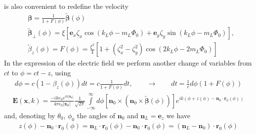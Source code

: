 is also convenient to redefine the velocity
\begin{align}
     & {\boldsymbol{\beta}} = \frac1{1+F(\phi)}\tilde{\boldsymbol{\beta}}(\phi)                                                                       \\
     & \tilde{\boldsymbol{\beta}}_\perp(\phi) =\xi\left[{\bm e}_x\zeta_x\cos(k_L\phi-m_L\varPhi_0)+{\bm e}_y\zeta_y\sin(k_L\phi-m_L\varPhi_0)\right], \\
     & \tilde\beta_z(\phi) =F(\phi)=\frac{\xi^2}4\left[1+(\zeta_x^2-\zeta_y^2)\cos(2k_L\phi-2m_L\varPhi_0)\right]
\end{align}
In the expression of the electric field we perform another change of variables from $ct$ to $\phi=ct-z$, using
\begin{align}
    d\phi = c (1-\beta_z(\phi)) dt = c\frac1{1+F(\phi)} dt,\qquad \rightarrow \qquad dt=\frac1c d\phi(1+F(\phi))
\end{align}
\begin{align}
    {\bm E}({\bm x},k) =\frac{-i k e_0 e^{ik |{\bm x}_0|}}{4\pi\epsilon_0|{\bm x}_0|}\frac1{\sqrt{2\pi}}\int\limits_{-\infty}^{\infty}d\phi\left[{{\bm n}_0\times({\bm n}_0\times\tilde{\boldsymbol\beta}(\phi))}\right]e^{ik(\phi +z(\phi)-{{\bm n}_0\cdot{\bm r}_0(\phi)})}
\end{align}
and, denoting by $\theta_0$, $\phi_0$ the angles of ${\bm n}_0$ and ${\bm n}_L={\bm e}_z$
we have
\begin{align}
    z(\phi)-{\bm n}_0\cdot{\bm r}_0(\phi)={\bm n}_L\cdot{\bm r}_0(\phi)-{\bm n}_0\cdot{\bm r}_0(\phi)=({\bm n}_L-{\bm n}_0)\cdot{\bm r}_0(\phi)
\end{align}

